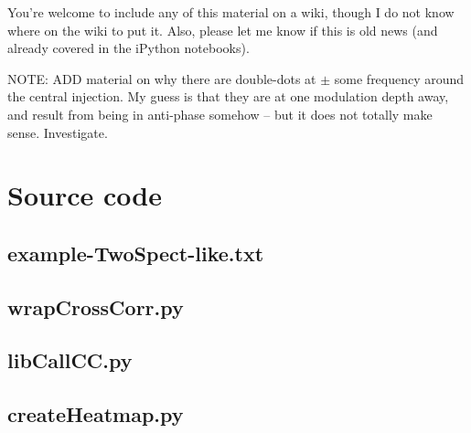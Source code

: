 \documentclass{article}
\begin{document}
You're welcome to include any of this material on a wiki, though I do
not know where on the wiki to put it. Also, please let me know if this
is old news (and already covered in the iPython notebooks).


NOTE: ADD material on why there are double-dots at $\pm$ some frequency around the central injection. My guess is that they are at one modulation depth away, and result from being in anti-phase somehow -- but it does not totally make sense. Investigate.

\newpage

\appendix
\section{Source code}
\label{source_code_appendix}

\subsection{example-TwoSpect-like.txt}

\subsection{wrapCrossCorr.py}

\subsection{libCallCC.py}

\subsection{createHeatmap.py}

\end{document}
